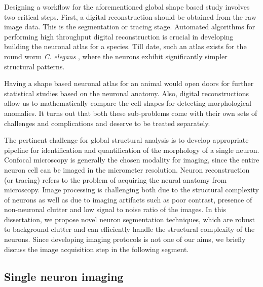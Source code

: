 Designing a workflow for  the aforementioned global shape based study involves two critical steps. First, a digital reconstruction should be obtained from the raw image data. This is the segmentation or tracing stage. Automated algorithms for performing high throughput digital reconstruction is crucial in developing building the neuronal atlas for a species. Till date, such an atlas exists for the round worm \textit{C. elegans} \cite{cElegans}, where the neurons exhibit significantly simpler structural patterns. 

Having a shape based neuronal atlas for an animal would open doors for further statistical studies based on the neuronal anatomy. Also, digital reconstructions allow us to mathematically compare the cell shapes for detecting morphological anomalies. It turns out that both these sub-problems come with their own sets of challenges and complications and deserve to be treated separately. 

The pertinent challenge for global structural analysis is to develop appropriate pipeline for identification and quantification of the morphology of a single neuron. Confocal microscopy is generally the chosen modality for imaging, since the entire neuron cell can be imaged in the micrometer resolution. Neuron reconstruction (or tracing) refers to the problem of acquiring the neural anatomy from microscopy.  Image processing is challenging both due to the structural complexity of neurons as well as due to imaging artifacts such as poor contrast, presence of non-neuronal clutter and low signal to noise ratio of the images. In this dissertation, we propose novel neuron segmentation techniques, which are robust to background clutter and can efficiently handle the structural complexity of the neurons. Since developing imaging protocols is not one of our aims, we briefly discuss the image acquisition step in the following segment.

\subsection{Single neuron imaging}


